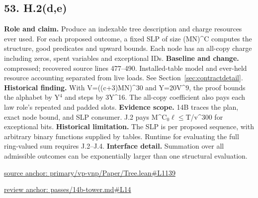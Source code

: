 \documentclass[11pt,letterpaper]{article}
\theoremstyle{definition}\newtheorem{definition}[theorem]{Definition}\newtheorem{example}[theorem]{Example}
\theoremstyle{remark}\newtheorem{remark}[theorem]{Remark}
\begin{document}
\subsection*{53. H.2(d,e)}
\textbf{Role and claim.} Produce an indexable tree description and charge resources ever used. For each proposed outcome, a fixed SLP of size (MN)\textasciicircum{}C computes the structure, good predicates and upward bounds. Each node has an all-copy charge including zeros, spent variables and exceptional IDs.
\textbf{Baseline and change.} compressed; recovered source lines 477--490. Installed-table model and ever-held resource accounting separated from live loads. See Section~\ref{sec:contractdetail}.
\textbf{Historical finding.} With V=((c+3)MN)\textasciicircum{}30 and Y=20V\textasciicircum{}9, the proof bounds the alphabet by Y\ensuremath{{}^4} and steps by 3Y\textasciicircum{}16. The all-copy coefficient also pays each law role's repeated and padded slots.
\textbf{Evidence scope.} 14B traces the plan, exact node bound, and SLP consumer. J.2 pays M\textasciicircum{}C\ensuremath{{}_0}\ensuremath{\ell}\ensuremath{\le}T/v\textasciicircum{}300 for exceptional bits.
\textbf{Historical limitation.} The SLP is per proposed sequence, with arbitrary binary functions supplied by tables. Runtime for evaluating the full ring-valued sum requires J.2–J.4.
\textbf{Interface detail.} Summation over all admissible outcomes can be exponentially larger than one structural evaluation.
\par\href{https://github.com/nousentllc/VP-VNP-Review/blob/8a7976933b6b2b4ffda1ad3a0dfb5fc6b6f023e8/primary/vp-vnp/Paper/Tree.lean\#L1139}{source anchor: primary/vp-vnp/Paper/Tree.lean\#L1139}
\par\href{https://github.com/nousentllc/VP-VNP-Review/blob/8a7976933b6b2b4ffda1ad3a0dfb5fc6b6f023e8/passes/14b-tower.md\#L14}{review anchor: passes/14b-tower.md\#L14}
\goodbreak
\end{document}
